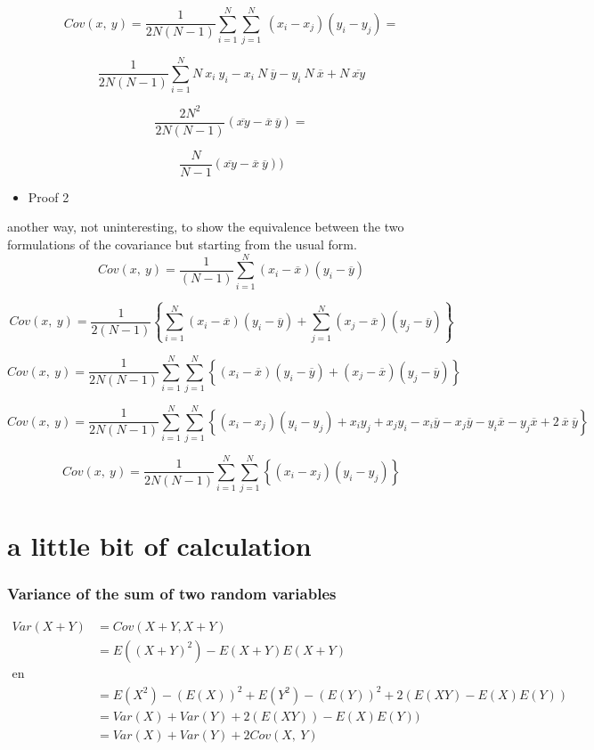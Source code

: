 \documentclass[
]{report}
\providecommand{\tightlist}{%
  \setlength{\itemsep}{0pt}\setlength{\parskip}{0pt}}
\begin{document}
\[Cov(x,~y)=\frac{1}{2N(N-1)}
\sum_{i=1}^{N} \sum_{j=1}^{N}~(x_i-x_j)(y_i-y_j)
=\]

\[\frac{1}{2N(N-1)}
\sum_{i=1}^{N} N~x_i~y_i -x_i~N~\overline{y}-y_i~N~\overline{x}+N~\overline{xy}\]

\[\frac{2N^2}{2N(N-1)}(\overline{xy}-\overline{x}~\overline{y})=\]

\[\frac{N}{N-1}(\overline{xy}-\overline{x}~\overline{y}))\]

\begin{itemize}
\tightlist
\item
  Proof 2
\end{itemize}

another way, not uninteresting, to show the equivalence between the two formulations of the covariance but starting from the usual form.
\[Cov(x,~y)=\frac{1}{(N-1)}
\sum_{i=1}^{N} (x_i-\overline{x})(y_i -\overline{y})\]

\[Cov(x,~y)=\frac{1}{2(N-1)} \left\{
\sum_{i=1}^{N} (x_i-\overline{x})(y_i -\overline{y}) +
\sum_{j=1}^{N} (x_j-\overline{x})(y_j -\overline{y}) \right\}\]

\[Cov(x,~y)=\frac{1}{2N(N-1)} 
\sum_{i=1}^{N} \sum_{j=1}^{N}\left\{(x_i-\overline{x})(y_i -\overline{y}) + (x_j-\overline{x})(y_j -\overline{y}) \right\}\]

\[Cov(x,~y)=\frac{1}{2N(N-1)} 
\sum_{i=1}^{N} \sum_{j=1}^{N}\left\{(x_i-x_j)(y_i-y_j)+x_iy_j+x_jy_i-x_i\overline{y}-x_j\overline{y}-y_i\overline{x}-y_j\overline{x}+2~\overline{x}~\overline{y}\right\}\]

\[Cov(x,~y)=\frac{1}{2N(N-1)} 
\sum_{i=1}^{N} \sum_{j=1}^{N}\left\{(x_i-x_j)(y_i-y_j)\right\}\]

\hypertarget{a-little-bit-of-calculation}{%
\section{a little bit of calculation}\label{a-little-bit-of-calculation}}

\hypertarget{variance-of-the-sum-of-two-random-variables}{%
\subsubsection{Variance of the sum of two random variables}\label{variance-of-the-sum-of-two-random-variables}}

\begin{align*}
Var(X+Y) &= Cov(X+Y,X+Y)  \\
 &= E((X+Y)^2)-E(X+Y)E(X+Y)   \\
\text{en développant,}  \\
 &= E(X^2) - (E(X))^2 + E(Y^2) - (E(Y))^2 + 2(E(XY) - E(X)E(Y))  \\
 &= Var(X) + Var(Y) + 2(E(XY)) - E(X)E(Y))  \\
 &= Var(X) + Var(Y) + 2 Cov(X,~Y)  \\
\end{align*}
\end{document}
